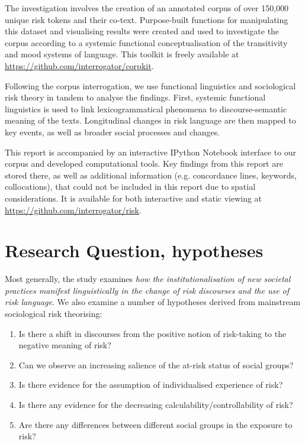 \documentclass{report}
\begin{document}
The investigation involves the creation of an annotated corpus of over 150,000 unique risk tokens and their co-text. Purpose-built functions for manipulating this dataset and visualising results were created and used to investigate the corpus according to a systemic functional conceptualisation of the transitivity and mood systems of language. This toolkit is freely available at \url{https://github.com/interrogator/corpkit}. 

Following the corpus interrogation, we use functional linguistics and sociological risk theory in tandem to analyse the findings. First, systemic functional linguistics is used to link lexicogrammatical phenomena to discourse-semantic meaning of the texts. Longitudinal changes in risk language are then mapped to key events, as well as broader social processes and changes.

This report is accompanied by an interactive IPython Notebook interface to our corpus and developed computational tools. Key findings from this report are stored there, as well as additional information (e.g. concordance lines, keywords, collocations), that could not be included in this report due to spatial considerations. It is available for both interactive and static viewing at \url{https://github.com/interrogator/risk}.

\section*{Research Question, hypotheses} 

Most generally, the study examines \emph{how the institutionalisation of new societal practices manifest linguistically in the change of risk discourses and the use of risk language}. We also examine a number of hypotheses derived from mainstream sociological risk theorising:

\begin{enumerate}
\item Is there a shift in discourses from the positive notion of risk-taking to the negative meaning of risk?
\item Can we observe an increasing salience of the at-risk status of social groups?
\item Is there evidence for the assumption of individualised experience of risk?
\item Is there any evidence for the decreasing calculability/controllability of risk?
\item Are there any differences between different social groups in the exposure to risk?
\end{enumerate}
\end{document}
